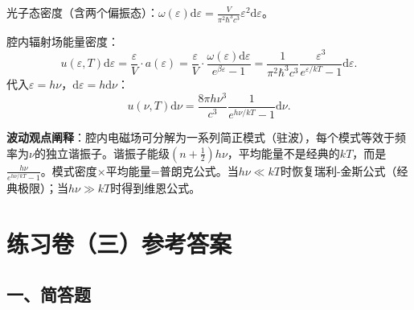 \documentclass[12pt,a4paper,fontset=mac]{ctexart}
\newcommand{\dd}{\mathrm{d}}
\newcommand{\đ}{\mathrm{đ}}
\begin{document}
\begin{enumerate}
光子态密度（含两个偏振态）：$\omega(\varepsilon)\dd\varepsilon=\frac{V}{\pi^2\hbar^3c^3}\varepsilon^2\dd\varepsilon$。

腔内辐射场能量密度：
\[u(\varepsilon,T)\dd\varepsilon=\frac{\varepsilon}{V}\cdot a(\varepsilon)=\frac{\varepsilon}{V}\cdot\frac{\omega(\varepsilon)\dd\varepsilon}{e^{\beta\varepsilon}-1}=\frac{1}{\pi^2\hbar^3c^3}\frac{\varepsilon^3}{e^{\varepsilon/kT}-1}\dd\varepsilon.\]
代入$\varepsilon=h\nu$，$\dd\varepsilon=h\dd\nu$：
\[u(\nu,T)\dd\nu=\frac{8\pi h\nu^3}{c^3}\frac{1}{e^{h\nu/kT}-1}\dd\nu.\]

\textbf{波动观点阐释}：腔内电磁场可分解为一系列简正模式（驻波），每个模式等效于频率为$\nu$的独立谐振子。谐振子能级$(n+\frac12)h\nu$，平均能量不是经典的$kT$，而是$\frac{h\nu}{e^{h\nu/kT}-1}$。模式密度$\times$平均能量=普朗克公式。当$h\nu\ll kT$时恢复瑞利-金斯公式（经典极限）；当$h\nu\gg kT$时得到维恩公式。

\end{enumerate}

\newpage

\section*{练习卷（三）参考答案}

\subsection*{一、简答题}
\end{document}
